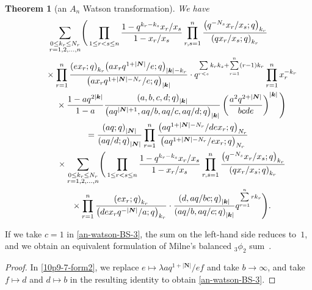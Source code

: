 \documentclass[pdftex]{sigma}
\numberwithin{equation}{section}
\newtheorem{Theorem}{Theorem}[section]
\newenvironment{Remark*}{\begin{remark*}\normalfont}{\end{remark*}}
\newcommand{\sumN}{{\left| \boldsymbol{N} \right|}}
\newcommand\sumk{{\left| \boldsymbol{k} \right|}}
\newcommand{\multsum}[3]{{\sum\limits_{\substack{{0\le #1_#3 \le #2_#3} \\
{#3 =1,2,\dots, n}}}}}
\newcommand{\qrfac}[2]{{\left({#1}; q\right)_{#2}}} %
\newcommand{\triprod}[1]{\prod\limits_{1\le r < s \le #1}}
\newcommand{\sqprod}[1]{\prod\limits_{r, s =1}^{#1}} %
\newcommand{\smallprod}[1]{\prod\limits_{r =1}^{#1}} %
\newcommand{\xover}[1]{#1_{r}/#1_{s}}
\newcommand{\vandermonde}[3]{\triprod{#3} %
 \frac{1-q^{#2_r-#2_s} \xover {#1} }{1-\xover{#1}}
}
\begin{document}
\begin{Theorem}[an $A_n$ Watson transformation] \label{th:an-watson-BS-3} We have
\begin{gather}
\multsum{k}{N}{r} \Bigg( \vandermonde{x}{k}{n}
\sqprod n \frac{\qrfac{q^{-N_s}\xover{x}}{k_r} }{\qrfac{q\xover{x}}{k_r} } \notag \\
\qquad\quad{} \times\smallprod n \frac{\qrfac{ex_r}{k_r} \qrfac{ax_rq^{1+\sumN}/e}{\sumk-k_r}}
{\qrfac{ax_rq^{1+\sumN-N_r}/e}{\sumk}}\cdot
q^{\sum\limits_{r<s}k_rk_s+\sum\limits_{r=1}^n (r-1)k_r } \smallprod n x_r^{-k_r}\notag \\
\qquad\quad{} \times \frac{1-aq^{2\sumk}}{1-a}
\frac{\qrfac{a, b, c, d}{\sumk}}{\qrfac{aq^{\sumN+1}, aq/b, aq/c, aq/d}{\sumk}}
\left(\frac{a^2q^{2+\sumN}}{bcde}\right)^{\sumk} \Bigg)\notag \\
\qquad {}= \frac{\qrfac{aq}{\sumN}}{\qrfac{aq/d}{\sumN}}
\smallprod n \frac{\qrfac{aq^{1+\sumN-N_r}/dex_r}{N_r}}{\qrfac{aq^{1+\sumN-N_r}/ex_r}{N_r}}\notag \\
\qquad\quad{} \times \multsum{k}{N}{r} \Bigg( \vandermonde{x}{k}{n}
\sqprod n \frac{\qrfac{q^{-N_s}\xover{x}}{k_r} }{\qrfac{q\xover{x}}{k_r} } \notag \\
\qquad\quad{} \times \smallprod n \frac{\qrfac{ex_r}{k_r}}
{ \qrfac{dex_rq^{-\sumN}/a}{k_r}} \cdot \frac{\qrfac{ d, aq/bc}{\sumk}}{\qrfac{aq/b, aq/c}{\sumk} }
q^{\sum\limits_{r=1}^n rk_r } \Bigg). \label{an-watson-BS-3}
\end{gather}
\end{Theorem}
\begin{Remark*} If we take $c=1$ in \eqref{an-watson-BS-3}, the sum on the left-hand side reduces to~$1$, and we obtain an equivalent formulation of Milne's balanced $_3\phi_2$ sum~\cite[Theorem~4.1]{Milne1997}.
\end{Remark*}
\begin{proof}
In \eqref{10p9-7-form2}, we replace $e\mapsto \lambda a q^{1+\sumN}/ef$ and take $b\to \infty$, and take $f\mapsto d$ and $d\mapsto b$ in the resulting identity to obtain \eqref{an-watson-BS-3}.
\end{proof}
\end{document}
